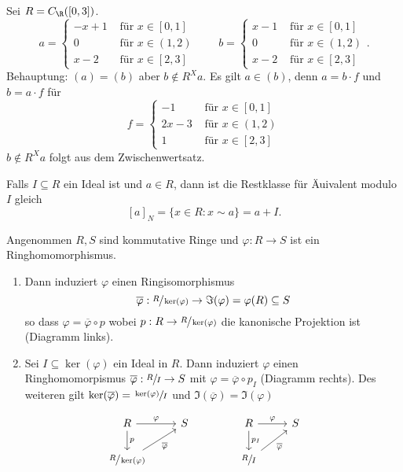 \begin{eg}
	Sei $R = C_{\R}([0,3])$.
	\[
	a = \begin{cases}
		-x+1 &\text{ für } x \in [0,1]\\
		0 &\text{ für } x \in (1,2)\\
		x-2 &\text{ für } x \in [2,3]
	\end{cases} \qquad b = \begin{cases}
		x-1 &\text{ für } x \in [0,1]\\
		0 &\text{ für } x \in (1,2)\\
		x-2 &\text{ für } x \in [2,3]
	\end{cases}
	.\] 
	Behauptung: $(a) = (b)$ aber $b \not\in R^{X} a$.
	Es gilt $a \in (b)$, denn $a = b  \cdot f$ und $b = a \cdot f$ für
	\[
	f = \begin{cases}
		
		-1 &\text{ für } x \in [0,1]\\
		2x-3 &\text{ für } x \in (1,2)\\
		1 &\text{ für } x \in [2,3]
	\end{cases}
\]
	$b \not\in R^{X} a$ folgt aus dem Zwischenwertsatz.
\end{eg}

Falls $I \subseteq R$ ein Ideal ist und $a \in R$, dann ist die Restklasse für Äuivalent modulo $I$ gleich
\[
	[a]_{N} = \{x \in R: x \sim a\} = a + I
.\] 

\begin{theorem}
	Angenommen $R,S$ sind kommutative Ringe und $\varphi: R  \to S$ ist ein Ringhomomorphismus.
	\begin{enumerate}
		\item Dann induziert $\varphi$ einen Ringisomorphismus
			\[
				\overline{\varphi}: \sfrac{R}{\ker(\varphi)} \to \Im(\varphi) = \varphi(R) \subseteq S
			\] 
			so dass $\varphi = \overline{\varphi} \circ p$ wobei $p : R \to \sfrac{R}{\ker(\varphi)}$ die kanonische Projektion ist (Diagramm links).
		\item Sei $I \subseteq \ker(\varphi)$ ein Ideal in $R$.
			Dann induziert $\varphi$ einen Ringhomomorpismus $\overline{\varphi}: \sfrac{R}{I} \to S$ mit $\varphi = \overline{\varphi} \circ p_{I}$ (Diagramm rechts).
			Des weiteren gilt $\ker(\overline{\varphi}) = \sfrac{\ker(\varphi)}{I}$ und $\Im(\overline{\varphi}) = \Im(\varphi)$
	\end{enumerate}
	\[
	\begin{tikzcd}
		R \arrow[d, "p"] \arrow[r, "\varphi"]                      & S \\
		\sfrac{R}{\ker(\varphi)} \arrow[ru, "\overline{\varphi}"'] &  
	\end{tikzcd}\qquad\qquad
	\begin{tikzcd}
		R \arrow[d, "p_{I}"] \arrow[r, "\varphi"]      & S \\
		\sfrac{R}{I} \arrow[ru, "\overline{\varphi}"'] &  
	\end{tikzcd}
	\]
\end{theorem}

